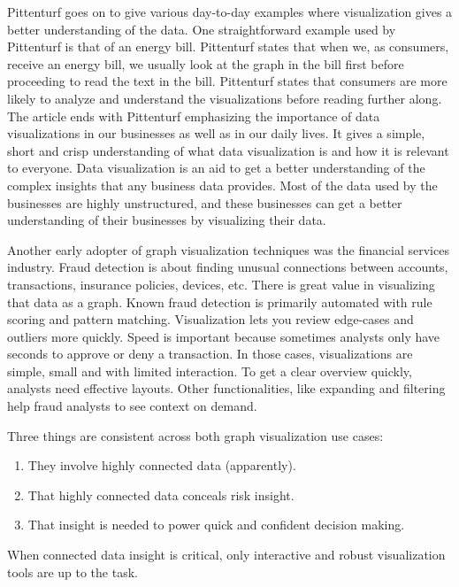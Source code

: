 \documentclass[]{book}
\providecommand{\tightlist}{%
  \setlength{\itemsep}{0pt}\setlength{\parskip}{0pt}}
\begin{document}
Pittenturf goes on to give various day-to-day examples where visualization gives a better understanding of the data. One straightforward example used by Pittenturf is that of an energy bill. Pittenturf states that when we, as consumers, receive an energy bill, we usually look at the graph in the bill first before proceeding to read the text in the bill. Pittenturf states that consumers are more likely to analyze and understand the visualizations before reading further along. The article ends with Pittenturf emphasizing the importance of data visualizations in our businesses as well as in our daily lives. It gives a simple, short and crisp understanding of what data visualization is and how it is relevant to everyone. Data visualization is an aid to get a better understanding of the complex insights that any business data provides. Most of the data used by the businesses are highly unstructured, and these businesses can get a better understanding of their businesses by visualizing their data.

Another early adopter of graph visualization techniques was the financial services industry. Fraud detection is about finding unusual connections between accounts, transactions, insurance policies, devices, etc. There is great value in visualizing that data as a graph. Known fraud detection is primarily automated with rule scoring and pattern matching. Visualization lets you review edge-cases and outliers more quickly. Speed is important because sometimes analysts only have seconds to approve or deny a transaction. In those cases, visualizations are simple, small and with limited interaction. To get a clear overview quickly, analysts need effective layouts. Other functionalities, like expanding and filtering help fraud analysts to see context on demand.

Three things are consistent across both graph visualization use cases:

\begin{enumerate}
\def\labelenumi{\arabic{enumi}.}
\tightlist
\item
  They involve highly connected data (apparently).
\item
  That highly connected data conceals risk insight.
\item
  That insight is needed to power quick and confident decision making.
\end{enumerate}

When connected data insight is critical, only interactive and robust visualization tools are up to the task.
\end{document}
